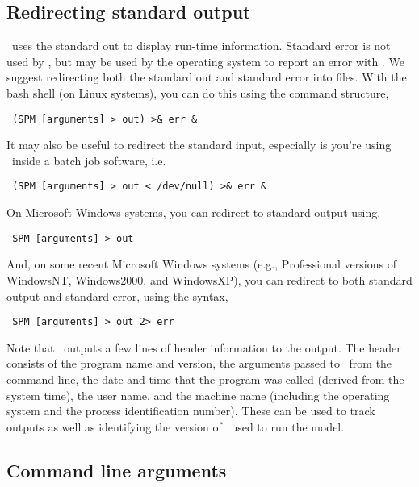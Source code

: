 \subsection{Redirecting standard output\label{sec:redirecting-stdout}}

\SPM\ uses the standard out to display run-time information. Standard error is not used by \SPM, but may be used by the operating system to report an error with \SPM. We suggest redirecting both the standard out and standard error into files. With the bash shell (on Linux systems), you can do this using the command structure,

\begin{verbatim} (SPM [arguments] > out) >& err &\end{verbatim}

It may also be useful to redirect the standard input, especially is you're using \SPM\ inside a batch job software, i.e. 

\begin{verbatim} (SPM [arguments] > out < /dev/null) >& err &\end{verbatim}

On Microsoft Windows systems, you can redirect to standard output using,

\begin{verbatim} SPM [arguments] > out\end{verbatim}

And, on some recent Microsoft Windows systems (e.g., Professional versions of WindowsNT, Windows2000, and WindowsXP), you can redirect to both standard output and standard error, using the syntax, 

\begin{verbatim} SPM [arguments] > out 2> err\end{verbatim}

Note that \SPM\ outputs a few lines of header information to the output. The header consists of the program name and version, the arguments passed to \SPM\ from the command line, the date and time that the program was called (derived from the system time), the user name, and the machine name (including the operating system and the process identification number). These can be used to track outputs as well as identifying the version of \SPM\ used to run the model.

\subsection{Command line arguments\label{sec:command-line-arguments}}

